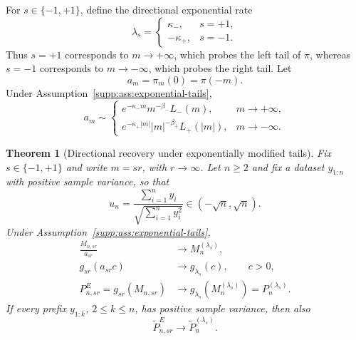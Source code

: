 \documentclass[numsec,webpdf,modern,medium,namedate]{oup-authoring-template}
\theoremstyle{thmstyleone}
\newtheorem{theorem}{Theorem}
\theoremstyle{thmstyletwo}
\begin{document}
For $s\in\{-1,+1\}$, define the directional exponential rate
\begin{equation}
\label{supp:eq:directional-lambda}
  \lambda_s
  =
  \begin{cases}
    \kappa_-, & s=+1,\\
    -\kappa_+, & s=-1.
  \end{cases}
\end{equation}
Thus $s=+1$ corresponds to $m\to+\infty$, which probes the left tail
of $\pi$, whereas $s=-1$ corresponds to $m\to-\infty$, which probes
the right tail.  Let
\begin{equation}
\label{supp:eq:directional-scale}
  a_m
  =
  \pi_m(0)
  =
  \pi(-m).
\end{equation}
Under Assumption~\ref{supp:ass:exponential-tails},
\begin{equation}
\label{supp:eq:directional-scale-asymptotics}
  a_m
  \sim
  \begin{cases}
    e^{-\kappa_-m}m^{-\beta_-}L_-(m),
      &m\to+\infty,\\[3pt]
    e^{-\kappa_+|m|}|m|^{-\beta_+}L_+(|m|),
      &m\to-\infty.
  \end{cases}
\end{equation}

\begin{theorem}[Directional recovery under exponentially modified tails]
\label{supp:thm:exponential-tail-recovery}
Fix $s\in\{-1,+1\}$ and write $m=sr$, with $r\to\infty$.  Let
$n\geq2$ and fix a dataset $y_{1:n}$ with positive sample variance, so
that
\begin{equation}
\label{supp:eq:fixed-un}
  u_n
  =
  \frac{\sum_{i=1}^ny_i}
       {\sqrt{\sum_{i=1}^ny_i^2}}
  \in(-\sqrt n,\sqrt n).
\end{equation}
Under Assumption~\ref{supp:ass:exponential-tails},
\begin{align}
  \frac{M_{n,sr}}{a_{sr}}
  &\longrightarrow
  M_n^{(\lambda_s)},
  \label{supp:eq:evidence-directional-limit}\\
  g_{sr}(a_{sr}c)
  &\longrightarrow
  g_{\lambda_s}(c),
  \qquad c>0,
  \label{supp:eq:calibration-directional-limit}\\
  P_{n,sr}^{E}
  =
  g_{sr}(M_{n,sr})
  &\longrightarrow
  g_{\lambda_s}\left(M_n^{(\lambda_s)}\right)
  =
  P_n^{(\lambda_s)}.
  \label{supp:eq:p-directional-limit}
\end{align}
If every prefix $y_{1:k}$, $2\leq k\leq n$, has positive sample
variance, then also
\begin{equation}
\label{supp:eq:running-directional-limit}
  \widetilde P_{n,sr}^{E}
  \longrightarrow
  \widetilde P_n^{(\lambda_s)}.
\end{equation}
\end{theorem}
\end{document}
